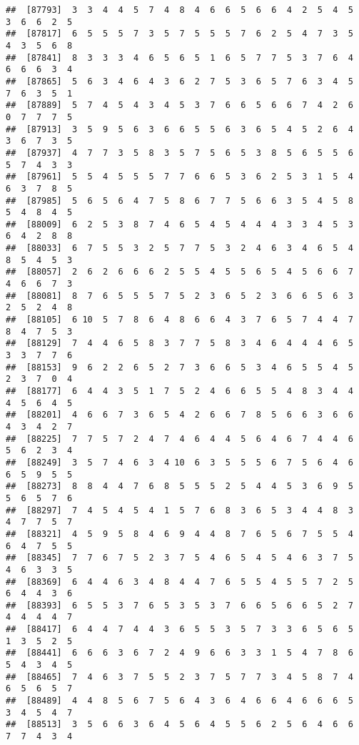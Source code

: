 \documentclass[
]{book}
\begin{document}
\begin{verbatim}
##  [87793]  3  3  4  4  5  7  4  8  4  6  6  5  6  6  4  2  5  4  5  3  6  6  2  5
##  [87817]  6  5  5  5  7  3  5  7  5  5  5  7  6  2  5  4  7  3  5  4  3  5  6  8
##  [87841]  8  3  3  3  4  6  5  6  5  1  6  5  7  7  5  3  7  6  4  6  6  6  3  4
##  [87865]  5  6  3  4  6  4  3  6  2  7  5  3  6  5  7  6  3  4  5  7  6  3  5  1
##  [87889]  5  7  4  5  4  3  4  5  3  7  6  6  5  6  6  7  4  2  6  0  7  7  7  5
##  [87913]  3  5  9  5  6  3  6  6  5  5  6  3  6  5  4  5  2  6  4  3  6  7  3  5
##  [87937]  4  7  7  3  5  8  3  5  7  5  6  5  3  8  5  6  5  5  6  5  7  4  3  3
##  [87961]  5  5  4  5  5  5  7  7  6  6  5  3  6  2  5  3  1  5  4  6  3  7  8  5
##  [87985]  5  6  5  6  4  7  5  8  6  7  7  5  6  6  3  5  4  5  8  5  4  8  4  5
##  [88009]  6  2  5  3  8  7  4  6  5  4  5  4  4  4  3  3  4  5  3  6  4  2  8  8
##  [88033]  6  7  5  5  3  2  5  7  7  5  3  2  4  6  3  4  6  5  4  8  5  4  5  3
##  [88057]  2  6  2  6  6  6  2  5  5  4  5  5  6  5  4  5  6  6  7  4  6  6  7  3
##  [88081]  8  7  6  5  5  5  7  5  2  3  6  5  2  3  6  6  5  6  3  2  5  2  4  8
##  [88105]  6 10  5  7  8  6  4  8  6  6  4  3  7  6  5  7  4  4  7  8  4  7  5  3
##  [88129]  7  4  4  6  5  8  3  7  7  5  8  3  4  6  4  4  4  6  5  3  3  7  7  6
##  [88153]  9  6  2  2  6  5  2  7  3  6  6  5  3  4  6  5  5  4  5  2  3  7  0  4
##  [88177]  6  4  4  3  5  1  7  5  2  4  6  6  5  5  4  8  3  4  4  4  5  6  4  5
##  [88201]  4  6  6  7  3  6  5  4  2  6  6  7  8  5  6  6  3  6  6  4  3  4  2  7
##  [88225]  7  7  5  7  2  4  7  4  6  4  4  5  6  4  6  7  4  4  6  5  6  2  3  4
##  [88249]  3  5  7  4  6  3  4 10  6  3  5  5  5  6  7  5  6  4  6  6  5  9  5  5
##  [88273]  8  8  4  4  7  6  8  5  5  5  2  5  4  4  5  3  6  9  5  5  6  5  7  6
##  [88297]  7  4  5  4  5  4  1  5  7  6  8  3  6  5  3  4  4  8  3  4  7  7  5  7
##  [88321]  4  5  9  5  8  4  6  9  4  4  8  7  6  5  6  7  5  5  4  6  4  7  5  5
##  [88345]  7  7  6  7  5  2  3  7  5  4  6  5  4  5  4  6  3  7  5  4  6  3  3  5
##  [88369]  6  4  4  6  3  4  8  4  4  7  6  5  5  4  5  5  7  2  5  6  4  4  3  6
##  [88393]  6  5  5  3  7  6  5  3  5  3  7  6  6  5  6  6  5  2  7  4  4  4  4  7
##  [88417]  6  4  4  7  4  4  3  6  5  5  3  5  7  3  3  6  5  6  5  1  3  5  2  5
##  [88441]  6  6  6  3  6  7  2  4  9  6  6  3  3  1  5  4  7  8  6  5  4  3  4  5
##  [88465]  7  4  6  3  7  5  5  2  3  7  5  7  7  3  4  5  8  7  4  6  5  6  5  7
##  [88489]  4  4  8  5  6  7  5  6  4  3  6  4  6  6  4  6  6  6  5  3  4  5  4  7
##  [88513]  3  5  6  6  3  6  4  5  6  4  5  5  6  2  5  6  4  6  6  7  7  4  3  4

\end{verbatim}
\end{document}
